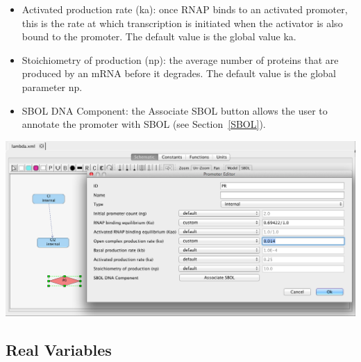 \documentclass[titlepage,11pt]{article}
\begin{document}
\begin{itemize}
\item Activated production rate (ka): once RNAP binds to an activated promoter, this is the rate at which transcription is initiated when the activator is also bound to the promoter.  The default value is the global value ka.
\item Stoichiometry of production (np): the average number of proteins that are produced by an mRNA before it degrades.  The default value is the global parameter np.
\item SBOL DNA Component: the Associate SBOL button allows the user to annotate the promoter with SBOL (see Section~\ref{SBOL}).
\end{itemize}

\begin{center}
\includegraphics[width=160mm]{screenshots/promoter}
\end{center}

\subsection{\label{Variables}Real Variables}
\end{document}
